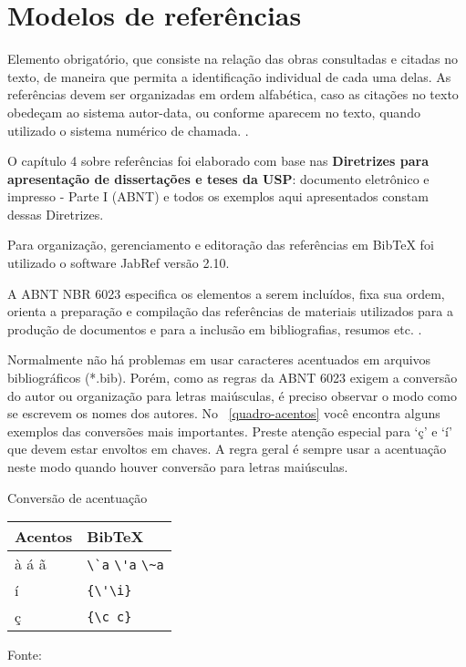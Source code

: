 

\chapter{Modelos de referências}

\label{ch: Res}
Elemento obrigatório, que consiste na relação das obras consultadas e citadas no texto, de maneira que permita a identificação individual de cada uma delas. As referências devem ser organizadas em ordem alfabética, caso as citações no texto obedeçam ao sistema autor-data, ou conforme aparecem no texto, quando utilizado o sistema numérico de chamada. \cite{sibi2009}.

O capítulo 4 sobre referências foi elaborado com base nas \textbf{Diretrizes para apresentação de dissertações e teses da USP}: documento eletrônico e impresso - Parte I (ABNT) e todos os exemplos aqui apresentados constam dessas Diretrizes.  

Para organização, gerenciamento e editoração das referências em BibTeX foi utilizado o software JabRef versão 2.10.

A ABNT NBR 6023 especifica os elementos a serem incluídos, fixa sua ordem, orienta a preparação e compilação das referências de materiais utilizados para a produção de documentos e para a inclusão em bibliografias, resumos etc. \cite{nbr6023}.

Normalmente não há problemas em usar caracteres acentuados em arquivos bibliográficos {(*.bib)}. Porém, como as regras da ABNT 6023 exigem a conversão do autor ou organização para letras maiúsculas, é preciso observar o modo como se escrevem os nomes dos autores. No ~\autoref{quadro-acentos} você encontra alguns
exemplos das conversões mais importantes. Preste atenção especial para `ç' e `í'
que devem estar envoltos em chaves. A regra geral é sempre usar a acentuação neste modo quando houver conversão para letras maiúsculas. \cite{abnetxcite} \\

\begin{quadro}[H]
	\caption{\label{quadro-acentos}Conversão de acentuação}
		\begin{tabular}{|p{7.5cm}|p{7.5cm}|}
			\hline
			\textbf{Acentos} & \textbf{BibTeX}\\
			\hline
			à á ã & \verb+\`a+ \verb+\'a+ \verb+\~a+\\
			\hline
			í & \verb+{\'\i}+\\
			\hline
			ç & \verb+{\c c}+\\
			\hline
		\end{tabular}
		\begin{flushleft}
			Fonte: 
		\end{flushleft}	
\end{quadro}


